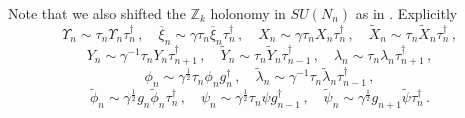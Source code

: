 \documentclass[main.tex]{subfiles}
\begin{document}
Note that we also shifted the $\mathbb{Z}_k$ holonomy in $SU(N_n)$ as in \cite{Bullimore:2014upa,Kanno:2011fw}. Explicitly
\begin{equation}
\Upsilon_n\sim \tau_n\Upsilon_n\tau_n^{\dagger}\,,\quad \overline{\xi}_n\sim\gamma\tau_n\overline{\xi}_n\tau_n^{\dagger}\,,\quad X_n\sim \gamma\tau_n X_n\tau_n^{\dagger}\,,\quad \tilde{X}_n\sim\tau_n\tilde{X}_n\tau_n^{\dagger}\,,\label{eqn:Zk1}
\end{equation}
\begin{equation}
Y_n\sim \gamma^{-1}\tau_n Y_n\tau_{n+1}^{\dagger}\,,\quad \tilde{Y}_n\sim \tau_n\tilde{Y}_{n}\tau^{\dagger}_{n-1}\,,\quad \lambda_n\sim \tau_n\lambda_n\tau_{n+1}^{\dagger}\,,\label{eqn:Zk2}
\end{equation}
\begin{equation}
\phi_n\sim \gamma^{\frac{1}{2}}\tau_n\phi_n g_n^{\dagger}\,,\quad \tilde{\lambda}_n\sim \gamma^{-1}\tau_n\tilde{\lambda}_n\tau_{n-1}^{\dagger}\,,
\end{equation}
\begin{equation}
\tilde{\phi}_n\sim \gamma^{\frac{1}{2}}g_n\tilde{\phi}_n\tau_n^{\dagger}\,,\quad \psi_n\sim \gamma^{\frac{1}{2}}\tau_n\psi g_{n-1}^{\dagger}\,,\quad \tilde{\psi}_n\sim \gamma^{\frac{1}{2}}g_{n+1}\tilde{\psi}\tau_n^{\dagger}\,.\label{eqn:Zk3}
\end{equation}
\end{document}
